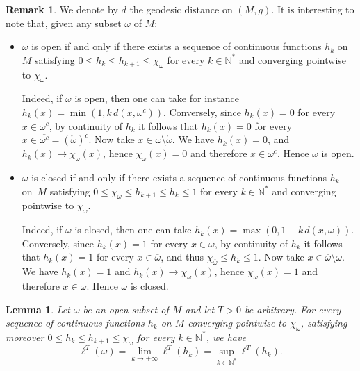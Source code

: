 \documentclass[JEP,XML,SOM,Unicode, NoEqCountersInSection,NoFloatCountersInSection,published]{cedram}
\def\N{\mathbb{N}}
\newtheorem{lemma}{Lemma}
\theoremstyle{definition}
\newtheorem{remark}{Remark}
\begin{document}
\begin{remark}\label{rem_openclosed}
We denote by $d$ the geodesic distance on $(M,g)$. It is interesting to note that, given any subset $\omega$ of $M$:
\begin{itemize}
\item $\omega$ is open if and only if there exists a sequence of continuous functions $h_k$ on $M$ satisfying $0\leq h_k\leq h_{k+1}\leq\chi_\omega$ for every $k\in\N^*$ and converging pointwise to $\chi_\omega$.

Indeed, if $\omega$ is open, then one can take for instance $h_k(x) = \min(1, k\, d(x,\omega^c))$. Conversely, since $h_k(x)=0$ for every $x\in\omega^c$, by continuity of $h_k$ it follows that $h_k(x)=0$ for every $x\in\overline{\omega^c}=(\mathring{\omega})^c$. Now take $x\in\omega\setminus\mathring{\omega}$. We have $h_k(x)= 0$, and $h_k(x)\rightarrow\chi_\omega(x)$, hence $\chi_\omega(x)=0$ and therefore $x\in\omega^c$. Hence $\omega$ is open.

\item $\omega$ is closed if and only if there exists a sequence of continuous functions $h_k$ on~$M$ satisfying $0\leq \chi_{\omega}\leq h_{k+1}\leq h_k\leq 1$ for every $k\in\N^*$ and converging pointwise to $\chi_\omega$.

Indeed, if $\omega$ is closed, then one can take $h_k(x) = \max(0,1-k\, d(x,\omega))$. Conversely, since $h_k(x)=1$ for every $x\in\omega$, by continuity of $h_k$ it follows that $h_k(x)=1$ for every $x\in\overline{\omega}$, and thus $\chi_{\overline{\omega}}\leq h_k\leq 1$. Now take $x\in\overline{\omega}\setminus\omega$. We have $h_k(x)=1$ and $h_k(x)\rightarrow\chi_\omega(x)$, hence $\chi_\omega(x)=1$ and therefore $x\in\omega$. Hence $\omega$ is closed.
\end{itemize}
\end{remark}

\begin{lemma}\label{lemopen}
Let $\omega$ be an open subset of $M$ and let $T>0$ be arbitrary. For every sequence of continuous functions $h_k$ on $M$ converging pointwise to $\chi_\omega$, satisfying moreover $0\leq h_k\leq h_{k+1}\leq\chi_\omega$ for every $k\in\N^*$, we have
\[
\ell^T(\omega) = \lim_{k\rightarrow +\infty} \ell^T(h_k) = \sup_{k\in\N^*} \ell^T(h_k).
\]
\end{lemma}
\end{document}
